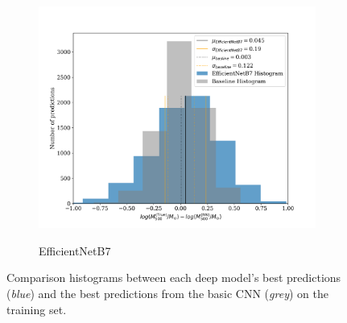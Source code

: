 \begin{figure}[H]
\begin{subfigure}{.325\textwidth}
    \includegraphics[width=\linewidth]{images/Chapter4/Results/training_EfficientNetB7_hist.png}
    \label{fig:training_EfficientNetB7_hist}
    \caption{EfficientNetB7}
\end{subfigure}
\caption{Comparison histograms between each deep model's best predictions (\textit{blue}) and the best predictions from the basic CNN (\textit{grey}) on the training set.}
\end{figure}
